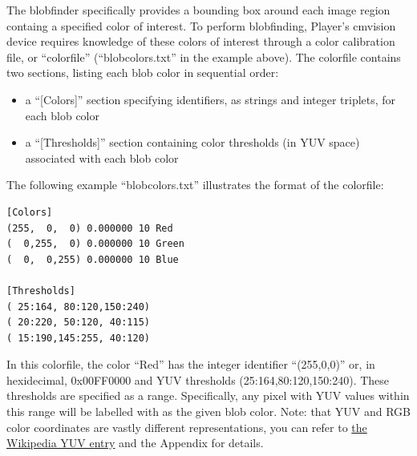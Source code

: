 The blobfinder specifically provides a bounding box around each image region containg a specified color of interest.  To perform blobfinding, 
Player's cmvision device requires knowledge of these colors of interest through a color calibration file, or ``colorfile'' (``blobcolors.txt'' 
in the example above). The colorfile contains two sections, listing each blob color in sequential order: 

\begin{itemize}
\item a ``[Colors]'' section specifying identifiers, as strings and integer triplets, for each blob color
\item a ``[Thresholds]'' section containing color thresholds (in YUV space) associated with each blob color
\end{itemize}

The following example ``blobcolors.txt'' illustrates the format of the colorfile:

\begin{verbatim}
[Colors]
(255,  0,  0) 0.000000 10 Red
(  0,255,  0) 0.000000 10 Green
(  0,  0,255) 0.000000 10 Blue

[Thresholds]
( 25:164, 80:120,150:240)
( 20:220, 50:120, 40:115)
( 15:190,145:255, 40:120)
\end{verbatim}

In this colorfile, the color ``Red'' has the integer identifier ``(255,0,0)'' or, in hexidecimal, 0x00FF0000 and YUV thresholds 
(25:164,80:120,150:240).  These thresholds are specified as a range.  Specifically, any pixel with YUV values within this range will be 
labelled with as the given blob color. Note: that YUV and RGB color coordinates are vastly different representations, you can refer to 
\href{http://en.wikipedia.org/wiki/YUV}{the Wikipedia YUV entry} and the Appendix for details.  

